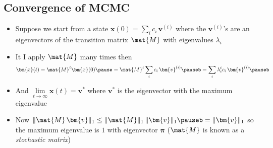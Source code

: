 \begin{slide}
\section{Convergence of MCMC}

\begin{PauseHighLight}
  \begin{itemize}
  \item Suppose we start from a state $\bm{x}(0) = \sum_{i} c_i\,\bm{v}^{(i)}$
    where the $\bm{v}^{(i)}$'s are an eigenvectors of the
    transition matrix $\mat{M}$ with eigenvalues $\lambda_i$\pause
  \item It I apply $\mat{M}$ many times then
    \begin{align*}
      \bm{x}(t) = \mat{M}^t \bm{x}(0)\pause
      =  \mat{M}^t \sum_{i} c_i\,\bm{v}^{(i)}\pauseb
      = \sum_{i} \lambda_i^{t} c_i\,\bm{v}^{(i)}\pauseb
    \end{align*}
  \item And $\lim\limits_{t\rightarrow\infty} \bm{x}(t) = \bm{v}^*$
    where $\bm{v}^*$ is the eigenvector with the maximum
    eigenvalue\pause
  \item Now $\|\mat{M}\,\bm{v}\|_1 \leq \|\mat{M}\|_1\,\|\bm{v}\|_1\pauseb =
    \|\bm{v}\|_1$\pauseb{} so the maximum eigenvalue is $1$\pauseb{} with
    eigenvector $\bm{\pi}$\pauseb{} ($\mat{M}$ is known as a
    \emph{stochastic matrix})\pauseb
  \end{itemize}
\end{PauseHighLight}

\end{slide}



